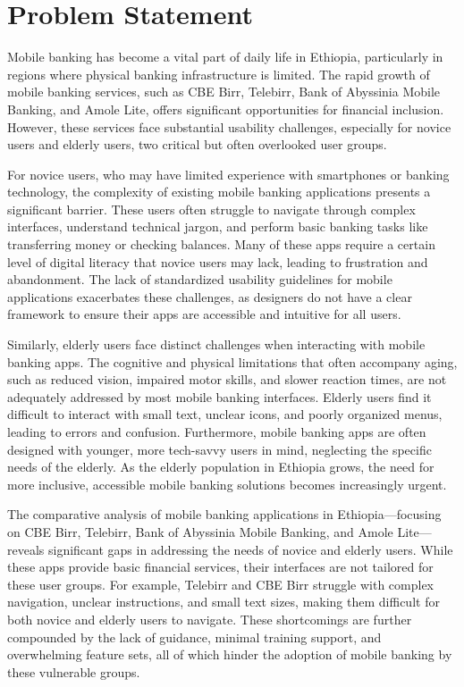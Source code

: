 \documentclass[a4paper,12pt]{report}
\begin{document}
\section{Problem Statement}
Mobile banking has become a vital part of daily life in Ethiopia, particularly in regions where physical banking infrastructure is limited. The rapid growth of mobile banking services, such as CBE Birr, Telebirr, Bank of Abyssinia Mobile Banking, and Amole Lite, offers significant opportunities for financial inclusion. However, these services face substantial usability challenges, especially for novice users and elderly users, two critical but often overlooked user groups.

For novice users, who may have limited experience with smartphones or banking technology, the complexity of existing mobile banking applications presents a significant barrier. These users often struggle to navigate through complex interfaces, understand technical jargon, and perform basic banking tasks like transferring money or checking balances. Many of these apps require a certain level of digital literacy that novice users may lack, leading to frustration and abandonment. The lack of standardized usability guidelines for mobile applications exacerbates these challenges, as designers do not have a clear framework to ensure their apps are accessible and intuitive for all users.

Similarly, elderly users face distinct challenges when interacting with mobile banking apps. The cognitive and physical limitations that often accompany aging, such as reduced vision, impaired motor skills, and slower reaction times, are not adequately addressed by most mobile banking interfaces. Elderly users find it difficult to interact with small text, unclear icons, and poorly organized menus, leading to errors and confusion. Furthermore, mobile banking apps are often designed with younger, more tech-savvy users in mind, neglecting the specific needs of the elderly. As the elderly population in Ethiopia grows, the need for more inclusive, accessible mobile banking solutions becomes increasingly urgent.

The comparative analysis of mobile banking applications in Ethiopia—focusing on CBE Birr, Telebirr, Bank of Abyssinia Mobile Banking, and Amole Lite—reveals significant gaps in addressing the needs of novice and elderly users. While these apps provide basic financial services, their interfaces are not tailored for these user groups. For example, Telebirr and CBE Birr struggle with complex navigation, unclear instructions, and small text sizes, making them difficult for both novice and elderly users to navigate. These shortcomings are further compounded by the lack of guidance, minimal training support, and overwhelming feature sets, all of which hinder the adoption of mobile banking by these vulnerable groups.
\end{document}

